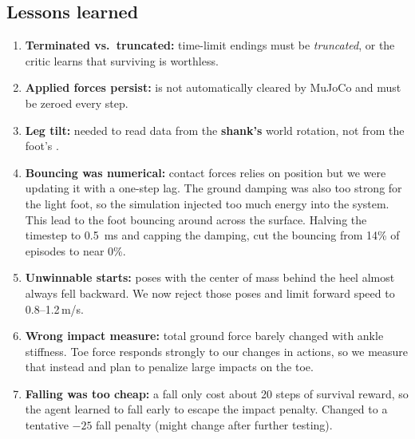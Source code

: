 \documentclass[10pt,a4paper]{article}
\newcommand{\code}[1]{\texttt{\detokenize{#1}}}
\begin{document}
\subsection{Lessons learned}
\begin{enumerate}[label=(\arabic*)]
\item \textbf{Terminated vs.\ truncated:} time-limit endings must be \emph{truncated}, or the critic learns that surviving is worthless.
\item \textbf{Applied forces persist:} \code{qfrc_applied} is not automatically cleared by MuJoCo and must be zeroed every step.
\item \textbf{Leg tilt:} needed to read data from the \textbf{shank's} world rotation, not from the foot's \code{foot_pitch}.
\item \textbf{Bouncing was numerical:} contact forces relies on position but we were updating it with a one-step lag. The ground damping was also too strong for the light foot, so the simulation injected too much energy into the system. This lead to the foot bouncing around across the surface. Halving the timestep to \SI{0.5}{ms} and capping the damping, cut the bouncing from 14\% of episodes to near 0\%.
\item \textbf{Unwinnable starts:} poses with the center of mass behind the heel almost always fell backward. We now reject those poses and limit forward speed to 0.8--1.2\,m/s.
\item \textbf{Wrong impact measure:} total ground force barely changed with ankle stiffness. Toe force responds strongly to our changes in actions, so we measure that instead and plan to penalize large impacts on the toe.
\item \textbf{Falling was too cheap:} a fall only cost about 20 steps of survival reward, so the agent learned to fall early to escape the impact penalty. Changed to a tentative $-25$ fall penalty (might change after further testing).
\end{enumerate}

\end{document}
